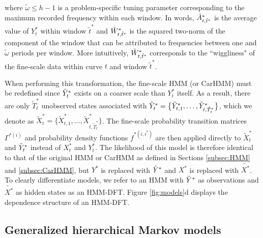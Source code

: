%
where $\tilde{\omega} \leq h-1$ is a problem-specific tuning parameter corresponding to the maximum recorded frequency within each window. In words, $\tilde{A}^*_{t,\tilde{t}^*}$ is the average value of $Y^*_t$ within window $\tilde{t}^*$ and $\tilde{W}^*_{t,\tilde{t}^*}$ is the squared two-norm of the component of the window that can be attributed to frequencies between one and $\tilde{\omega}$ periods per window. %
More intuitively, $\tilde{W}^*_{t,\tilde{t}^*}$ corresponds to the ``wiggliness" of the fine-scale data within curve $t$ and window $\tilde{t}^*$.

When performing this transformation, the fine-scale HMM (or CarHMM) must be redefined since $\tilde{Y}^*_t$ exists on a coarser scale than $Y^*_t$ itself. As a result, there are only $\tilde{T}_t^*$ unobserved states associated with $\tilde{Y}^*_t = \big\{\tilde{Y}^*_{t,1},\ldots, \tilde{Y}^*_{t,\tilde{T}^*_t}\big\}$, which we denote as $\tilde{X}^*_t = \big\{\tilde{X}^*_{t,1},\ldots, \tilde{X}^*_{t,\tilde{T}^*_t}\big\}$. The fine-scale probability transition matrices  $\Gamma^{*(i)}$ and probability density functions $f^{*(i,i^*)}$ are then applied directly to $\tilde{X}^*_t$ and $\tilde{Y}^*_t$ instead of $X^*_t$ and $Y^*_t$. The likelihood of this model is therefore identical to that of the original HMM or CarHMM as defined in Sections \ref{subsec:HMM} and \ref{subsec:CarHMM}, but $Y^*$ is replaced with $\tilde{Y}^*$ and $X^*$ is replaced with $\tilde{X^*}$. To clearly differentiate models, we refer to an HMM with $\tilde{Y}^*$ as observations and $\tilde{X^*}$ as hidden states as an HMM-DFT. Figure \ref{fig:models}d displays the dependence structure of an HMM-DFT.

\subsection{Generalized hierarchical Markov models}

